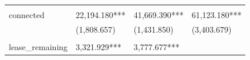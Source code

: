 \documentclass[]{book}
\begin{document}
\begin{longtable}[]{@{}llll@{}}
\begin{minipage}[t]{0.22\columnwidth}
\strut
\end{minipage}\tabularnewline
\begin{minipage}[t]{0.18\columnwidth}\raggedright\strut
connected\strut
\end{minipage} & \begin{minipage}[t]{0.24\columnwidth}\raggedright\strut
22,194.180***\strut
\end{minipage} & \begin{minipage}[t]{0.24\columnwidth}\raggedright\strut
41,669.390***\strut
\end{minipage} & \begin{minipage}[t]{0.22\columnwidth}\raggedright\strut
61,123.180***\strut
\end{minipage}\tabularnewline
\begin{minipage}[t]{0.18\columnwidth}\raggedright\strut
\strut
\end{minipage} & \begin{minipage}[t]{0.24\columnwidth}\raggedright\strut
(1,808.657)\strut
\end{minipage} & \begin{minipage}[t]{0.24\columnwidth}\raggedright\strut
(1,431.850)\strut
\end{minipage} & \begin{minipage}[t]{0.22\columnwidth}\raggedright\strut
(3,403.679)\strut
\end{minipage}\tabularnewline
\begin{minipage}[t]{0.18\columnwidth}\raggedright\strut
\strut
\end{minipage} & \begin{minipage}[t]{0.24\columnwidth}\raggedright\strut
\strut
\end{minipage} & \begin{minipage}[t]{0.24\columnwidth}\raggedright\strut
\strut
\end{minipage} & \begin{minipage}[t]{0.22\columnwidth}\raggedright\strut
\strut
\end{minipage}\tabularnewline
\begin{minipage}[t]{0.18\columnwidth}\raggedright\strut
lease\_remaining\strut
\end{minipage} & \begin{minipage}[t]{0.24\columnwidth}\raggedright\strut
3,321.929***\strut
\end{minipage} & \begin{minipage}[t]{0.24\columnwidth}\raggedright\strut
3,777.677***\strut
\end{minipage} & \begin{minipage}[t]{0.22\columnwidth}\raggedright\strut

\end{minipage}
\end{longtable}
\end{document}
